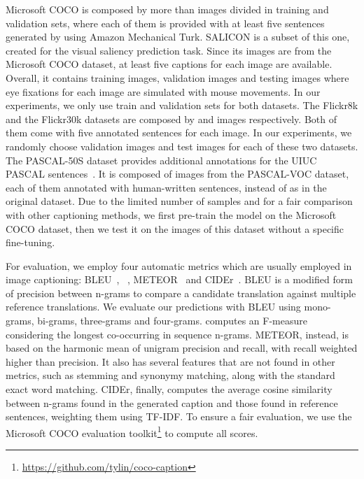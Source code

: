 Microsoft COCO is composed by more than  images divided in training and validation sets, where each of them is provided with at least five sentences generated by using Amazon Mechanical Turk. SALICON is a subset of this one, created for the visual saliency prediction task. Since its images are from the Microsoft COCO dataset, at least five captions for each image are available. Overall, it contains  training images,  validation images and  testing images where eye fixations for each image are simulated with mouse movements. In our experiments, we only use train and validation sets for both datasets. The Flickr8k and the Flickr30k datasets are composed by  and  images respectively. Both of them come with five annotated sentences for each image. In our experiments, we randomly choose  validation images and  test images for each of these two datasets. The PASCAL-50S dataset provides additional annotations for the UIUC PASCAL sentences~\cite{rashtchian2010collecting}. It is composed of  images from the PASCAL-VOC dataset, each of them annotated with  human-written sentences, instead of  as in the original dataset. Due to the limited number of samples and for a fair comparison with other captioning methods, we first pre-train the model on the Microsoft COCO dataset, then we test it on the images of this dataset without a specific fine-tuning.

For evaluation, we employ four automatic metrics which are usually employed in image captioning: BLEU~\cite{papineni2002bleu}, ~\cite{lin2004rouge}, METEOR~\cite{banerjee2005meteor} and CIDEr~\cite{vedantam2015cider}. 
BLEU is a modified form of precision between n-grams to compare a candidate translation against multiple reference translations. We evaluate our predictions with BLEU using mono-grams, bi-grams, three-grams and four-grams. 
 computes an F-measure considering the longest co-occurring in sequence n-grams.
METEOR, instead, is based on the harmonic mean of unigram precision and recall, with recall weighted higher than precision. It also has several features that are not found in other metrics, such as stemming and synonymy matching, along with the standard exact word matching. CIDEr, finally, computes the average cosine similarity between n-grams found in the generated caption and those found in reference sentences, weighting them using TF-IDF. To ensure a fair evaluation, we use the Microsoft COCO evaluation toolkit\footnote{\url{https://github.com/tylin/coco-caption}} to compute all scores.

